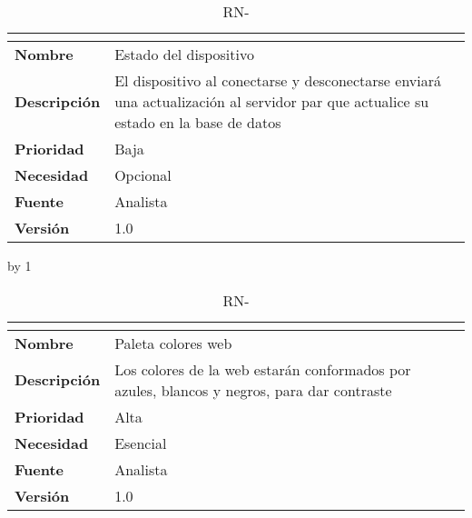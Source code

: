 \begin{table}[H]
	\caption{RN-\number\rn}
	\begin{tabular}{|l|p{}|}
		\hline
		\multicolumn{2}{|c|}{\cellcolor[HTML]{BFBFBF}{\color[HTML]{000000} \textbf{RN-\number\rn}}} \\ \hline
		\textbf{Nombre}      & Estado del dispositivo                                                                                                             \\ \hline
		\textbf{Descripción} & El dispositivo al conectarse y desconectarse enviará una actualización al servidor par que actualice su estado en la base de datos \\ \hline
		\textbf{Prioridad}   & Baja                                                                                                                               \\ \hline
		\textbf{Necesidad}   & Opcional                                                                                                                           \\ \hline
		\textbf{Fuente}      & Analista                                                                                                                           \\ \hline
		\textbf{Versión}     & 1.0                                                                                                                                \\ \hline
	\end{tabular}
\end{table}
\advance\rn by 1
\begin{table}[H]
	\caption{RN-\number\rn}
	\begin{tabular}{|l|p{}|}
		\hline
		\multicolumn{2}{|c|}{\cellcolor[HTML]{BFBFBF}{\color[HTML]{000000} \textbf{RN-\number\rn}}} \\ \hline
		\textbf{Nombre}      & Paleta colores web                                                                         \\ \hline
		\textbf{Descripción} & Los colores de la web estarán conformados por azules, blancos y negros, para dar contraste \\ \hline
		\textbf{Prioridad}   & Alta                                                                                       \\ \hline
		\textbf{Necesidad}   & Esencial                                                                                   \\ \hline
		\textbf{Fuente}      & Analista                                                                                   \\ \hline
		\textbf{Versión}     & 1.0                                                                                        \\ \hline
	\end{tabular}
\end{table}
